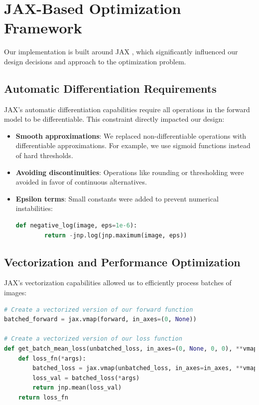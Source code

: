 \documentclass[nomenclature, english, bibtex]{kththesis}
\numberwithin{listing}{chapter}
\begin{document}
\section{JAX-Based Optimization Framework}
Our implementation is built around JAX \cite{jax2018github}, which significantly influenced our design decisions and approach to the optimization problem.

\subsection{Automatic Differentiation Requirements}
JAX's automatic differentiation capabilities require all operations in the forward model to be differentiable. This constraint directly impacted our design:

\begin{itemize}
    \item \textbf{Smooth approximations}: We replaced non-differentiable operations with differentiable approximations. For example, we use sigmoid functions instead of hard thresholds.

    \item \textbf{Avoiding discontinuities}: Operations like rounding or thresholding were avoided in favor of continuous alternatives.

    \item \textbf{Epsilon terms}: Small constants were added to prevent numerical instabilities:
    \begin{lstlisting}[language=Python]
    def negative_log(image, eps=1e-6):
        return -jnp.log(jnp.maximum(image, eps))
    \end{lstlisting}
\end{itemize}

\subsection{Vectorization and Performance Optimization}
JAX's vectorization capabilities allowed us to efficiently process batches of images:

\begin{lstlisting}[language=Python]
# Create a vectorized version of our forward function
batched_forward = jax.vmap(forward, in_axes=(0, None))

# Create a vectorized version of our loss function
def get_batch_mean_loss(unbatched_loss, in_axes=(0, None, 0, 0), **vmap_args):
    def loss_fn(*args):
        batched_loss = jax.vmap(unbatched_loss, in_axes=in_axes, **vmap_args)
        loss_val = batched_loss(*args)
        return jnp.mean(loss_val)
    return loss_fn
\end{lstlisting}
\end{document}
